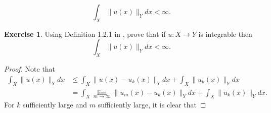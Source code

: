 \documentclass{amsart}
\theoremstyle{plain}
\theoremstyle{definition}
\newtheorem{exer}{Exercise}[section]
\begin{document}
$$\int_{X} \|u(x)\|_{Y} dx < \infty.$$
\begin{exer}
   Using Definition 1.2.1 in \cite{lord2014introduction}, prove that if $u:X\to Y$ is integrable then 
        $$\int_{X} \|u(x)\|_{Y} dx < \infty.$$
\end{exer}
\begin{proof}
    Note that 
    \begin{align*}
        \int_{X} \|u(x)\|_{Y} dx &\leq \int_{X} \|u(x)-u_k(x)\|_{Y} dx + \int_{X} \|u_k(x)\|_{Y} dx \\
        & = \int_{X} \lim_{m\to \infty} \|u_m(x)-u_k(x)\|_{Y} dx + \int_{X} \|u_k(x)\|_{Y} dx .
    \end{align*}
    For $k$ sufficiently large and $m$ sufficiently large, it is clear that 
\end{proof}

\printbibliography
\end{document}
